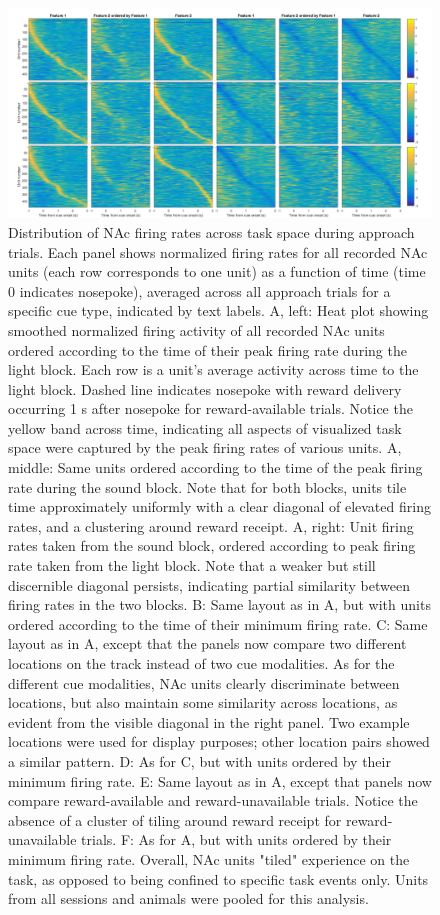 \documentclass[11pt]{article}
\begin{document}
\begin{figure}[h]
\centering
\includegraphics[width=\textwidth]{Fig 11 - NP task tiling.png}
\caption{Distribution of NAc firing rates across task space during approach trials. Each panel shows normalized firing rates for all recorded NAc units (each row corresponds to one unit) as a function of time (time 0 indicates nosepoke), averaged across all approach trials for a specific cue type, indicated by text labels. A, left: Heat plot showing smoothed normalized firing activity of all recorded NAc units ordered according to the time of their peak firing rate during the light block. Each row is a unit’s average activity across time to the light block. Dashed line indicates nosepoke with reward delivery occurring 1 s after nosepoke for reward-available trials. Notice the yellow band across time, indicating all aspects of visualized task space were captured by the peak firing rates of various units. A, middle: Same units ordered according to the time of the peak firing rate during the sound block. Note that for both blocks, units tile time approximately uniformly with a clear diagonal of elevated firing rates, and a clustering around reward receipt. A, right: Unit firing rates taken from the sound block, ordered according to peak firing rate taken from the light block. Note that a weaker but still discernible diagonal persists, indicating partial similarity between firing rates in the two blocks. B: Same layout as in A, but with units ordered according to the time of their minimum firing rate. C: Same layout as in A, except that the panels now compare two different locations on the track instead of two cue modalities. As for the different cue modalities, NAc units clearly discriminate between locations, but also maintain some similarity across locations, as evident from the visible diagonal in the right panel. Two example locations were used for display purposes; other location pairs showed a similar pattern. D: As for C, but with units ordered by their minimum firing rate. E: Same layout as in A, except that panels now compare reward-available and reward-unavailable trials. Notice the absence of a cluster of tiling around reward receipt for reward-unavailable trials. F: As for A, but with units ordered by their minimum firing rate. Overall, NAc units "tiled" experience on the task, as opposed to being confined to specific task events only. Units from all sessions and animals were pooled for this analysis.}
\label{fig:NP_tiling}
\end{figure}
\end{document}
